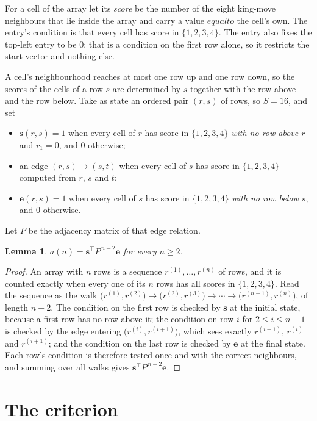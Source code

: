\documentclass[11pt,a4paper]{article}
\theoremstyle{plain}
\newtheorem{lemma}[theorem]{Lemma}
\theoremstyle{definition}
\begin{document}
For a cell of the array let its \emph{score} be the number of the eight king-move neighbours that lie inside
the array and carry a value $equal to$ the cell's own. The entry's condition is that every cell
has score in $\{1,2,3,4\}$. The entry also fixes the top-left entry to be $0$; that is a condition on the first row alone, so it restricts the start vector and nothing else.

A cell's neighbourhood reaches at most one row up and one row down, so the scores of the
cells of a row $s$ are determined by $s$ together with the row above and the row below.
Take as state an ordered pair $(r,s)$ of rows, so $S=16$, and set
\begin{itemize}
\item $\mathbf{s}(r,s)=1$ when every cell of $r$ has score in $\{1,2,3,4\}$ \emph{with no row
above $r$} and $r_1=0$, and $0$ otherwise;
\item an edge $(r,s)\to(s,t)$ when every cell of $s$ has score in $\{1,2,3,4\}$ computed from
$r$, $s$ and $t$;
\item $\mathbf{e}(r,s)=1$ when every cell of $s$ has score in $\{1,2,3,4\}$ \emph{with no row
below $s$}, and $0$ otherwise.
\end{itemize}
Let $P$ be the adjacency matrix of that edge relation.

\begin{lemma}\label{lem:walk}
$a(n)=\mathbf{s}^{\!\top}P^{\,n-2}\mathbf{e}$ for every $n\ge2$.
\end{lemma}

\begin{proof}
An array with $n$ rows is a sequence $r^{(1)},\dots,r^{(n)}$ of rows, and it is counted
exactly when every one of its $n$ rows has all scores in $\{1,2,3,4\}$. Read the sequence as the
walk $\bigl(r^{(1)},r^{(2)}\bigr)\to\bigl(r^{(2)},r^{(3)}\bigr)\to\cdots\to
\bigl(r^{(n-1)},r^{(n)}\bigr)$, of length $n-2$. The condition on the first row is
checked by $\mathbf{s}$ at the initial state, because a first row has no row above it; the
condition on row $i$ for $2\le i\le n-1$ is checked by the edge entering
$\bigl(r^{(i)},r^{(i+1)}\bigr)$, which sees exactly $r^{(i-1)}$, $r^{(i)}$ and
$r^{(i+1)}$; and the condition on the last row is checked by $\mathbf{e}$ at the final
state. Each row's condition is therefore tested once and with the correct neighbours, and
summing over all walks gives $\mathbf{s}^{\!\top}P^{\,n-2}\mathbf{e}$.
\end{proof}

\section{The criterion}
\end{document}
